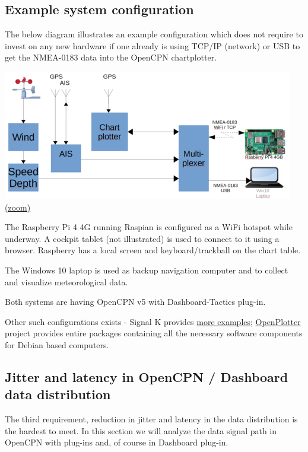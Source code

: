 \documentclass[11pt]{article}
\begin{document}
    \hypertarget{example-system-configuration}{%
\subsection{Example system
configuration}\label{example-system-configuration}}

    The below diagram illustrates an example configuration which does not
require to invest on any new hardware if one already is using TCP/IP
(network) or USB to get the NMEA-0183 data into the OpenCPN
chartplotter.

    \includegraphics{signalkin-instrudiagram-1.png}
\href{img/signalkin-instrudiagram-1.png}{(zoom)}

    The Raspberry Pi 4 4G running Raspian is configured as a WiFi hotspot
while underway. A cockpit tablet (not illustrated) is used to connect to
it using a browser. Raspberry has a local screen and keyboard/trackball
on the chart table.

    The Windows 10 laptop is used as backup navigation computer and to
collect and visualize meteorological data.

    Both systems are having OpenCPN v5 with Dashboard-Tactics plug-in.

    Other such configurations exists - Signal K provides
\href{https://signalk.org/installation.html}{more examples};
\href{http://www.sailoog.com/openplotter}{OpenPlotter} project provides
entire packages containing all the necessary software components for
Debian based computers.

    \hypertarget{jitter-and-latency-in-opencpn-dashboard-data-distribution}{%
\subsection{Jitter and latency in OpenCPN / Dashboard data
distribution}\label{jitter-and-latency-in-opencpn-dashboard-data-distribution}}

    The third requirement, reduction in jitter and latency in the data
distribution is the hardest to meet. In this section we will analyze the
data signal path in OpenCPN with plug-ins and, of course in Dashboard
plug-in.
\end{document}
